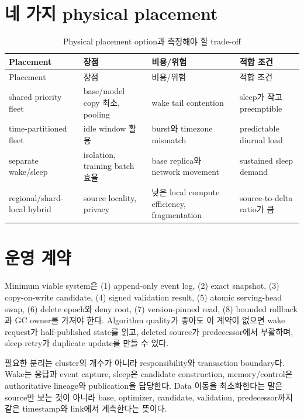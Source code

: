 \section{네 가지 physical placement}

\begin{longtable}{L{0.18\textwidth} L{0.22\textwidth} L{0.24\textwidth} L{0.21\textwidth}}
\caption{Physical placement option과 측정해야 할 trade-off}\label{tab:placement-options}\\
\toprule
Placement & 장점 & 비용/위험 & 적합 조건 \\
\midrule
\endfirsthead
\toprule
Placement & 장점 & 비용/위험 & 적합 조건 \\
\midrule
\endhead
shared priority fleet & base/model copy 최소, pooling & wake tail contention & sleep가 작고 preemptible \\
time-partitioned fleet & idle window 활용 & burst와 timezone mismatch & predictable diurnal load \\
separate wake/sleep & isolation, training batch 효율 & base replica와 network movement & sustained sleep demand \\
regional/shard-local hybrid & source locality, privacy & 낮은 local compute efficiency, fragmentation & source-to-delta ratio가 큼 \\
\bottomrule
\end{longtable}

\section{운영 계약}

Minimum viable system은 (1) append-only event log, (2) exact snapshot, (3) copy-on-write candidate,
(4) signed validation result, (5) atomic serving-head swap, (6) delete epoch와 deny root, (7) version-pinned
read, (8) bounded rollback과 GC owner를 가져야 한다. Algorithm quality가 좋아도 이 계약이 없으면 wake
request가 half-published state를 읽고, deleted source가 predecessor에서 부활하며, sleep retry가 duplicate
update를 만들 수 있다.

\begin{keypoint}[Infra 결론]
필요한 분리는 cluster의 개수가 아니라 responsibility와 transaction boundary다. Wake는 응답과 event
capture, sleep은 candidate construction, memory/control은 authoritative lineage와 publication을 담당한다.
Data 이동을 최소화한다는 말은 source만 보는 것이 아니라 base, optimizer, candidate, validation,
predecessor까지 같은 timestamp와 link에서 계측한다는 뜻이다.
\end{keypoint}
